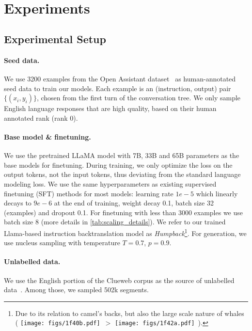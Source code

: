 \section{Experiments}
\label{results}

\subsection{Experimental Setup}
\label{subsec:exp_setup}

\paragraph{Seed data.}  We use 3200 examples from the Open Assistant dataset~\citep{kopf2023openassistant} as human-annotated seed data to train our models. Each example is an (instruction, output) pair $\{(x_{i}, y_{i})\}$, chosen from the first turn of the conversation tree. We only sample English language responses that are high quality, based on their human annotated rank (rank 0). 

\vspace{-2mm}
\paragraph{Base model \& finetuning.} We use the pretrained LLaMA model \citep{touvron2023llama} with 7B, 33B and 65B parameters as the base models for finetuning. During training, we only optimize the loss on the output tokens, not the input tokens, thus deviating from the standard language modeling loss. We use the same hyperparameters as existing supervised finetuning (SFT) methods \citep{zhou2023lima,touvron2023llama} for most models:  learning rate $1e-5$ which linearly decays to $9e-6$ at the end of training, weight decay 0.1, batch size 32 (examples) and dropout 0.1. For finetuning with less than 3000 examples we use batch size 8 (more details in \autoref{tab:scaling_details}). We refer to our trained Llama-based  instruction backtranslation model as {\em Humpback}\footnote{Due to its relation to camel's backs, but also the large scale nature of whales ( 
\texttt{[image: figs/1f40b.pdf]}~{\footnotesize{$>$}}
\texttt{[image: figs/1f42a.pdf]}~).
}. For generation, we use nucleus sampling \citep{holtzman2019curious} with temperature $T=0.7$, $p=0.9$.
\vspace{-2mm}
\paragraph{Unlabelled data.} We use the English portion of  the Clueweb corpus as the source of unlabelled data~\citep{overwijk2022clueweb22}.  Among those, we sampled 502k segments.

